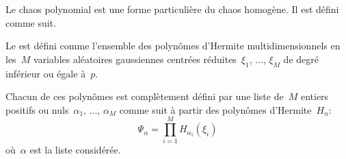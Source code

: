 \medskip
Le chaos polynomial est une forme particulière du chaos homogène. Il est défini comme suit.

\begin{definition}
Le  est défini comme l'ensemble des polynômes d'Hermite multidimensionnels en les~$M$ variables aléatoires gaussiennes centrées réduites~$\xi_1$, ..., $\xi_M$ de degré inférieur ou égale à~$p$.

Chacun de ces polynômes est complètement défini par une liste de~$M$ entiers positifs ou nuls~$\alpha_1$, ..., $\alpha_M$ comme suit à partir des polynômes d'Hermite~$H_n$:
\begin{equation}
\Psi_\alpha = \prod_{i=1}^M H_{\alpha_i}(\xi_i)
\end{equation}
où~$\alpha$ est la liste considérée.
\end{definition}


